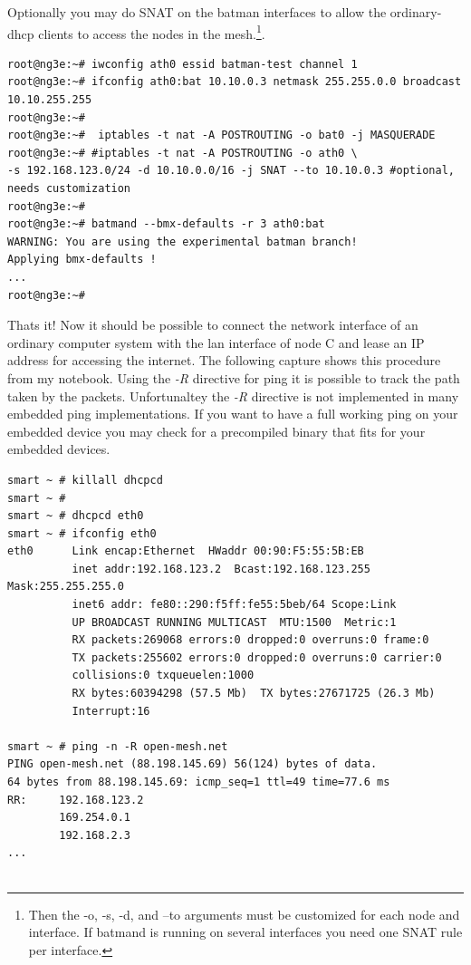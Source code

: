 \documentclass[11pt]{article}
\begin{document}
\begin{enumerate}
Optionally you may do SNAT on the batman interfaces to allow the ordinary-dhcp clients to access the nodes in the mesh.\footnote{Then the -o, -s, -d, and --to arguments must be customized for each node and interface. If batmand is running on several interfaces you need one SNAT rule per interface.}.

\begin{small} \begin{verbatim}
root@ng3e:~# iwconfig ath0 essid batman-test channel 1
root@ng3e:~# ifconfig ath0:bat 10.10.0.3 netmask 255.255.0.0 broadcast 10.10.255.255
root@ng3e:~#
root@ng3e:~#  iptables -t nat -A POSTROUTING -o bat0 -j MASQUERADE
root@ng3e:~# #iptables -t nat -A POSTROUTING -o ath0 \
-s 192.168.123.0/24 -d 10.10.0.0/16 -j SNAT --to 10.10.0.3 #optional, needs customization
root@ng3e:~#
root@ng3e:~# batmand --bmx-defaults -r 3 ath0:bat
WARNING: You are using the experimental batman branch!
Applying bmx-defaults !
...
root@ng3e:~#

\end{verbatim} \end{small}

Thats it! Now it should be possible to connect the network interface of an ordinary computer system with the lan interface of node C and lease an IP address for accessing the internet. The following capture shows this procedure from my notebook. Using the \emph{-R} directive for ping it is possible to track the path taken by the packets.
Unfortunaltey the \emph{-R} directive is not implemented in many embedded ping implementations. If you want to have a full working ping on your embedded device you may check \cite{useful-net-tools} for a precompiled binary that fits for your embedded devices.

\begin{small} \begin{verbatim}
smart ~ # killall dhcpcd
smart ~ #
smart ~ # dhcpcd eth0
smart ~ # ifconfig eth0
eth0      Link encap:Ethernet  HWaddr 00:90:F5:55:5B:EB
          inet addr:192.168.123.2  Bcast:192.168.123.255  Mask:255.255.255.0
          inet6 addr: fe80::290:f5ff:fe55:5beb/64 Scope:Link
          UP BROADCAST RUNNING MULTICAST  MTU:1500  Metric:1
          RX packets:269068 errors:0 dropped:0 overruns:0 frame:0
          TX packets:255602 errors:0 dropped:0 overruns:0 carrier:0
          collisions:0 txqueuelen:1000
          RX bytes:60394298 (57.5 Mb)  TX bytes:27671725 (26.3 Mb)
          Interrupt:16

smart ~ # ping -n -R open-mesh.net
PING open-mesh.net (88.198.145.69) 56(124) bytes of data.
64 bytes from 88.198.145.69: icmp_seq=1 ttl=49 time=77.6 ms
RR:     192.168.123.2
        169.254.0.1
        192.168.2.3
...


\end{verbatim}
\end{small}
\end{enumerate}
\end{document}
